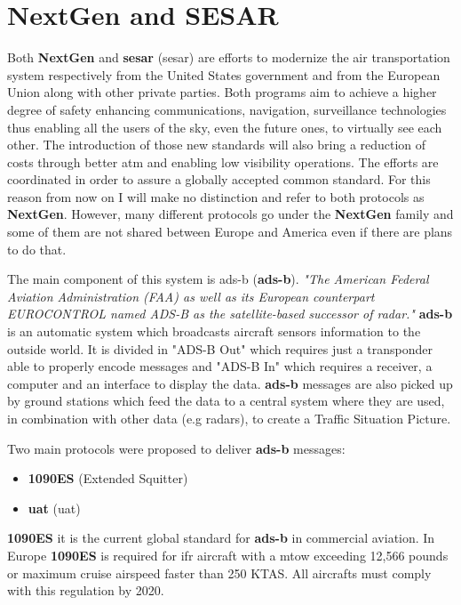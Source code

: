 \documentclass[../main.tex]{subfiles}
\begin{document}
\section{NextGen and SESAR}

Both \textbf{NextGen} and \textbf{\acrshort{sesar}} (\acrlong{sesar}) are efforts to modernize the air transportation system respectively from the United States government and from the European Union along with other private parties. Both programs aim to achieve a higher degree of safety enhancing communications, navigation, surveillance technologies thus enabling all the users of the sky, even the future ones, to virtually see each other. The introduction of those new standards will also bring a reduction of costs through better \acrshort{atm} and enabling low visibility operations. The efforts are coordinated in order to assure a globally accepted common standard. For this reason from now on I will make no distinction and refer to both protocols as \textbf{NextGen}. However, many different protocols go under the \textbf{NextGen} family and some of them are not shared between Europe and America even if there are plans to do that.

The main component of this system is \acrlong{ads-b} (\textbf{\acrshort{ads-b}}).
\textit{"The American Federal Aviation Administration (FAA) as well as its European counterpart EUROCONTROL named ADS-B as the satellite-based successor of radar."}\cite{stroh14}
\textbf{\acrshort{ads-b}} is an automatic system which broadcasts aircraft sensors information to the outside world. It is divided in "ADS-B Out" which requires just a transponder able to properly encode messages and "ADS-B In" which requires a receiver, a computer and an interface to display the data.
\textbf{\acrshort{ads-b}} messages are also picked up by ground stations which feed the data to a central system where they are used, in combination with other data (e.g radars), to create a Traffic Situation Picture.

Two main protocols were proposed to deliver \textbf{\acrshort{ads-b}} messages:
\begin{itemize}
  \item \textbf{1090ES} (Extended Squitter)
  \item \textbf{\acrshort{uat}} (\acrlong{uat})
\end{itemize}

\textbf{1090ES} it is the current global standard for \textbf{\acrshort{ads-b}} in commercial aviation. In Europe \textbf{1090ES} is required for \acrshort{ifr} aircraft with a \acrshort{mtow} exceeding 12,566 pounds or maximum cruise airspeed faster than 250 KTAS. All aircrafts must comply with this regulation by 2020. \cite{eu1090}
\end{document}
